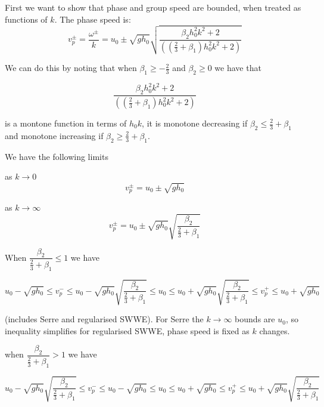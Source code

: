 \documentclass[10pt]{article}
\begin{document}
First we want to show that phase and group speed are bounded, when treated as functions of $k$.
The phase speed is:
\begin{equation}
v^\pm_p = \frac{\omega^\pm}{k}=u_0 \pm  \sqrt{gh_0} \sqrt{\dfrac{\beta_2 h_0^2 k^2 + 2}{\left( \left(\frac{2}{3} + \beta_1\right) h_0^2 k^2 + 2\right)} }
\end{equation} 

We can do this by noting that when $\beta_1 \ge -\frac{2}{3}$ and $\beta_2 \ge 0$ we have that 

\begin{equation}
\dfrac{\beta_2 h_0^2 k^2 + 2}{\left( \left(\frac{2}{3} + \beta_1\right) h_0^2 k^2 + 2\right)}
\end{equation}

is a montone function in terms of $h_0k$, it is monotone decreasing if $\beta_2 \le \frac{2}{3} + \beta_1$ and monotone increasing if $\beta_2 \ge \frac{2}{3} + \beta_1$.
 
We have the following limits

as $k \rightarrow 0$
\begin{equation}
 v^\pm_p = u_0 \pm \sqrt{gh_0}
\end{equation} 

as $k \rightarrow \infty$
\begin{equation}
v^\pm_p = u_0 \pm \sqrt{gh_0} \sqrt{\dfrac{\beta_2}{\frac{2}{3} + \beta_1}}
\end{equation}

When $\dfrac{\beta_2}{\frac{2}{3} + \beta_1} \le 1$ we have

\begin{equation}
u_0 -  \sqrt{gh_0} \le  v^-_p \le u_0 - \sqrt{gh_0} \sqrt{\dfrac{\beta_2}{\frac{2}{3} + \beta_1}} \le u_0 \le u_0 + \sqrt{gh_0} \sqrt{\dfrac{\beta_2}{\frac{2}{3} + \beta_1}} \le   v^+_p  \le u_0 +   \sqrt{gh_0}
\end{equation}

(includes Serre and regularised SWWE). For Serre the $k \rightarrow \infty $ bounds are $u_0$, so inequality simplifies for regularised SWWE, phase speed is fixed as $k$ changes. 

when $\dfrac{\beta_2}{\frac{2}{3} + \beta_1} > 1$ we have

\begin{equation}
u_0 - \sqrt{gh_0} \sqrt{\dfrac{\beta_2}{\frac{2}{3} + \beta_1}} \le v^-_p \le u_0 -  \sqrt{gh_0} \le  u_0 \le u_0 + \sqrt{gh_0} \le   v^+_p  \le u_0 +  \sqrt{gh_0} \sqrt{\dfrac{\beta_2}{\frac{2}{3} + \beta_1}}
\end{equation}
\end{document}
